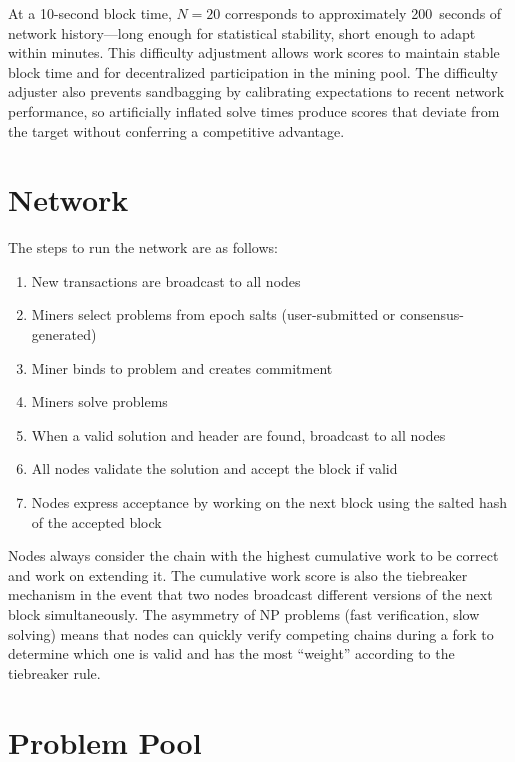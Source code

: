 \documentclass[12pt,letterpaper]{article}
\begin{document}
At a 10-second block time, $N = 20$ corresponds to approximately 200~seconds of network
history---long enough for statistical stability, short enough to adapt within minutes. This difficulty
adjustment allows work scores to maintain stable block time and for decentralized participation in
the mining pool. The difficulty adjuster also prevents sandbagging by calibrating expectations to recent
network performance, so artificially inflated solve times produce scores that deviate from the target
without conferring a competitive advantage.

\section*{Network}

The steps to run the network are as follows:

\begin{enumerate}[leftmargin=2em,itemsep=2pt]
  \item New transactions are broadcast to all nodes
  \item Miners select problems from epoch salts (user-submitted or consensus-generated)
  \item Miner binds to problem and creates commitment
  \item Miners solve problems
  \item When a valid solution and header are found, broadcast to all nodes
  \item All nodes validate the solution and accept the block if valid
  \item Nodes express acceptance by working on the next block using the salted hash of the accepted block
\end{enumerate}

Nodes always consider the chain with the highest cumulative work to be correct and work on extending
it. The cumulative work score is also the tiebreaker mechanism in the event that two nodes broadcast
different versions of the next block simultaneously. The asymmetry of NP problems (fast verification,
slow solving) means that nodes can quickly verify competing chains during a fork to determine which one
is valid and has the most ``weight'' according to the tiebreaker rule.

\section*{Problem Pool}
\end{document}
